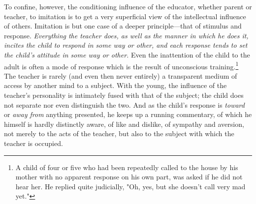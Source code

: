 \documentclass[showtrims,ustradepaper]{memoir}
\begin{document}
To confine, however, the conditioning influence of the educator, whether
parent or teacher, to imitation is to get a very superficial view of the
intellectual influence of others. Imitation is but one case of a deeper
principle---that of stimulus and response. \emph{Everything the teacher
does, as well as the manner in which he does it, incites the child to
respond in some way or other, and each response tends to set the child's
attitude in some way or other.} Even the inattention of the child to the
adult is often a mode of response which is the result of unconscious
training.\footnote{
A child of four or five who had been repeatedly called to the house by
his mother with no apparent response on his own part, was asked if he
did not hear her. He replied quite judicially, "Oh, yes, but she doesn't
call very mad yet."
}
The teacher is rarely (and even then never entirely) a transparent
medium of access by another mind to a subject. With the young, the
influence of the teacher's personality is intimately fused with that of
the subject; the child does not
separate
nor even distinguish the two. And as the child's response is
\emph{toward} or \emph{away from} anything presented, he keeps up a
running commentary, of which he himself is hardly distinctly aware, of
like and dislike, of sympathy and aversion, not merely to the acts of
the teacher, but also to the subject with which the teacher is occupied.


\end{document}
